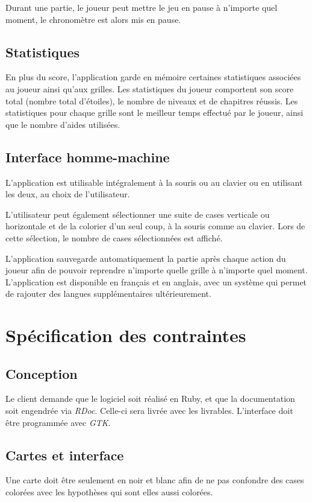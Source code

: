 \documentclass{report}
\begin{document}
			Durant une partie, le joueur peut mettre le jeu en pause à n'importe quel moment, le chronomètre est alors mis en pause.

		\section{Statistiques}
			En plus du score, l'application garde en mémoire certaines statistiques associées au joueur ainsi qu'aux grilles. Les statistiques du joueur comportent son score total (nombre total d'étoiles), le nombre de niveaux et de chapitres réussis. Les statistiques pour chaque grille sont le meilleur temps effectué par le joueur, ainsi que le nombre d'aides utilisées.

		\section{Interface homme-machine}
			L'application est utilisable intégralement à la souris ou au clavier ou en utilisant les deux, au choix de l'utilisateur.
			
			L'utilisateur peut également sélectionner une suite de cases verticale ou horizontale et de la colorier d'un seul coup, à la souris comme au clavier. Lors de cette sélection, le nombre de cases sélectionnées est affiché. 
			
			L'application sauvegarde automatiquement la partie après chaque action du joueur afin de pouvoir reprendre n'importe quelle grille à n'importe quel moment.
			L'application est disponible en français et en anglais, avec un système qui permet de rajouter des langues supplémentaires ultérieurement.
			
\chapter{Spécification des contraintes}

	\section{Conception}
		Le client demande que le logiciel soit réalisé en Ruby, et que la documentation soit engendrée via \textit{RDoc}. Celle-ci sera livrée avec les livrables. L'interface doit être programmée avec \textit{GTK}.
		
	\section{Cartes et interface}
		Une carte doit être seulement en noir et blanc afin de ne pas confondre des cases colorées avec les hypothèses qui sont elles aussi colorées.
		
\end{document}
